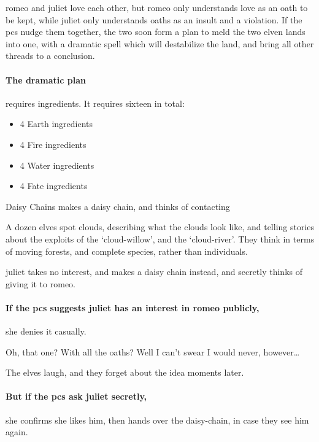 
\Gls{romeo} and \gls{juliet} love each other, but \gls{romeo} only understands love as an oath to be kept, while \gls{juliet} only understands oaths as an insult and a violation.
If the \glspl{pc} nudge them together, the two soon form a plan to meld the two elven lands into one, with a dramatic spell which will destabilize the land, and bring all other threads to a conclusion.

\paragraph{The dramatic plan}
requires \glspl{ingredient}.
It requires sixteen in total:

\begin{itemize}
  \item
  4 Earth \glspl{ingredient}
  \item
  4 Fire \glspl{ingredient}
  \item
  4 Water \glspl{ingredient}
  \item
  4 Fate \glspl{ingredient}
\end{itemize}


{Daisy Chains}%
{ makes a daisy chain, and thinks of contacting }%

A dozen elves spot clouds, describing what the clouds look like, and telling stories about the exploits of the `cloud-willow', and the `cloud-river'.
They think in terms of moving forests, and complete species, rather than individuals.

\Gls{juliet} takes no interest, and makes a daisy chain instead, and secretly thinks of giving it to \gls{romeo}.

\paragraph{If the \glspl{pc} suggests \gls{juliet} has an interest in \gls{romeo} publicly,}
she denies it casually.

\begin{speechtext}
  Oh, that one?
  With all the oaths?
  Well I can't swear I would never, however\ldots
\end{speechtext}

The elves laugh, and they forget about the idea moments later.

\paragraph{But if the \glspl{pc} ask \gls{juliet} secretly,}
she confirms she likes him, then hands over the daisy-chain, in case they see him again.

